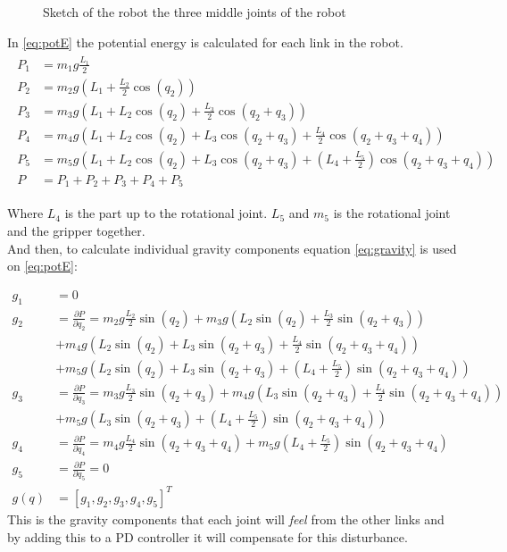 \begin{figure}[htbp]
    \centering
    
    \caption{Sketch of the robot the three middle joints of the robot}
    \label{draw:pot-rob}
\end{figure}
     
In \eqref{eq:potE} the potential energy is calculated for each link in the robot. 
 \begin{align}
    \begin{split}\label{eq:potE}
        P_1 &= m_1g\frac{L_1}{2}
        \\
        P_2 &= m_2g\left(L_1 + \frac{L_2}{2}\cos{(q_2)}\right)
        \\
        P_3 &= m_3g\left(L_1 +  L_2 \cos{(q_2)} + \frac{L_3}{2}\cos{(q_2 + q_3)} \right)
        \\
        P_4 &= m_4g\left(L_1 +  L_2 \cos{(q_2)} + L_3\cos{(q_2 + q_3)} + \frac{L_4}{2}\cos{(q_2+q_3+q_4)} \right)
        \\
        P_5 &=m_5g\left(L_1 +  L_2 \cos{(q_2)} + L_3\cos{(q_2 + q_3)} + \left(L_4 + \frac{L_5}{2} \right)\cos{(q_2+q_3+q_4)} \right)
        \\
        P &= P_1 + P_2 + P_3 + P_4 + P_5
    \end{split}   
 \end{align}    


 Where $L_4$ is the part up to the rotational joint. $L_5$ and $m_5$ is the rotational joint and the gripper together.  \\
 
 And then, to calculate individual gravity components equation \eqref{eq:gravity} is used on \eqref{eq:potE}:

 \begin{align*}
    g_1 &= 0
    \\
    g_2 &= \frac{\partial P}{\partial q_2} = 
    m_2g\frac{L_2}{2}\sin{(q_2)}+
    m_3g\left( L_2 \sin{(q_2)} + \frac{L_3}{2}\sin{(q_2+q_3)} \right)\\&+
    m_4g\left( L_2 \sin{(q_2)} + L_3\sin{(q_2 + q_3)} + \frac{L_4}{2}\sin{(q_2+q_3+q_4)} \right)\\&+
    m_5g\left( L_2 \sin{(q_2)} + L_3\sin{(q_2 + q_3)} + \left(L_4 + \frac{L_5}{2} \right)\sin{(q_2+q_3+q_4)} \right)
    \\
    g_3 &= \frac{\partial P}{\partial q_3} =
    m_3g\frac{L_3}{2}\sin{(q_2+q_3)} +
    m_4g\left( L_3\sin{(q_2 + q_3)} + \frac{L_4}{2}\sin{(q_2+q_3+q_4)} \right)\\&+
    m_5g\left(  L_3\sin{(q_2 + q_3)} + \left(L_4 + \frac{L_5}{2} \right)\sin{(q_2+q_3+q_4)} \right)
    \\
    g_4 &=\frac{\partial P}{\partial q_4} = 
    m_4g\frac{L_4}{2}\sin{(q_2+q_3+q_4)}+
    m_5g\left(L_4 + \frac{L_5}{2} \right)\sin{(q_2+q_3+q_4)}
    \\
    g_5 &= \frac{\partial P}{\partial q_5} = 0
    \\
    g(q) &= [g_1,g_2,g_3,g_4,g_5]^T
 \end{align*}
This is the gravity components that each joint will \textit{feel} from the other links and by adding this to a PD controller it will compensate for this disturbance. 

